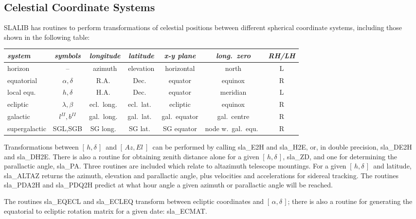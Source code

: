\documentclass[11pt,twoside,nolof]{starlink}
\providecommand{\radec}     {$[\,\alpha,\delta\,]$}
\providecommand{\hadec}     {$[\,h,\delta\,]$}
\providecommand{\azel}      {$[\,Az,El~]$}
\begin{document}
\subsection {Celestial Coordinate Systems}
SLALIB has routines to perform transformations
of celestial positions between different spherical
coordinate systems, including those shown in the following table:

\begin{center}
\begin{tabular}{|l|c|c|c|c|c|c|} \hline
\textit{system} & \textit{symbols} & \textit{longitude} & \textit{latitude} &
          \textit{x-y plane} & \textit{long.\ zero} & \textit{RH/LH}
\\ \hline \hline
horizon & -- & azimuth & elevation & horizontal & north & L
\\ \hline
equatorial & $\alpha,\delta$ & R.A.\ & Dec.\ & equator & equinox & R
\\ \hline
local equ.\ & $h,\delta$ & H.A.\ & Dec.\ & equator & meridian & L
\\ \hline
ecliptic & $\lambda,\beta$ & ecl.\ long.\ & ecl.\ lat.\ &
                                       ecliptic & equinox & R
\\ \hline
galactic & $l^{I\!I},b^{I\!I}$ & gal.\ long.\ & gal.\ lat.\ &
                                       gal.\ equator & gal.\ centre & R
\\ \hline
supergalactic & SGL,SGB & SG long.\ & SG lat.\ &
                                       SG equator & node w.\ gal.\ equ.\ & R
\\ \hline
\end{tabular}
\end{center}
Transformations between \hadec\ and \azel\ can be performed by
calling
sla\_E2H
and
sla\_H2E,
or, in double precision,
sla\_DE2H
and
sla\_DH2E.
There is also a routine for obtaining
zenith distance alone for a given \hadec,
sla\_ZD,
and one for determining the parallactic angle,
sla\_PA.
Three routines are included which relate to altazimuth telescope
mountings.  For a given \hadec\ and latitude,
sla\_ALTAZ
returns the azimuth, elevation and parallactic angle, plus
velocities and accelerations for sidereal tracking.
The routines
sla\_PDA2H
and
sla\_PDQ2H
predict at what hour angle a given azimuth or
parallactic angle will be reached.

The routines
sla\_EQECL
and
sla\_ECLEQ
transform between ecliptic
coordinates and \radec\/; there is also a routine for generating the
equatorial to ecliptic rotation matrix for a given date:
sla\_ECMAT.
\end{document}
